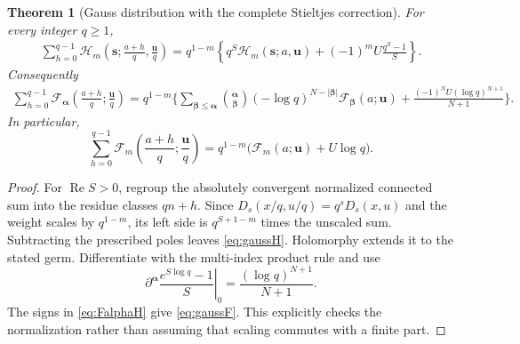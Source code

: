 \documentclass[11pt]{article}
\numberwithin{equation}{section}
\newtheorem{theorem}{Theorem}[section]
\theoremstyle{definition}\newtheorem{definition}[theorem]{Definition}
\theoremstyle{remark}\newtheorem{remark}[theorem]{Remark}
\newcommand{\Rea}{\operatorname{Re}}
\newcommand{\bs}{\boldsymbol{s}}
\newcommand{\bu}{\boldsymbol{u}}
\newcommand{\ba}{\boldsymbol{\alpha}}
\newcommand{\bb}{\boldsymbol{\beta}}
\newcommand{\cH}{\mathcal H}
\newcommand{\cF}{\mathcal F}
\begin{document}
\begin{theorem}[Gauss distribution with the complete Stieltjes correction]\label{thm:gauss}
For every integer $q\ge1$,
\begin{align}\label{eq:gaussH}
 \sum_{h=0}^{q-1}\cH_m\left(\bs;\frac{a+h}{q},\frac{\bu}{q}\right)
 =q^{1-m}\left\{q^S\cH_m(\bs;a,\bu)
       +(-1)^mU\frac{q^S-1}{S}\right\}.
\end{align}
Consequently
\begin{align}\label{eq:gaussF}
 \sum_{h=0}^{q-1}\cF_{\ba}\left(\frac{a+h}{q};\frac{\bu}{q}\right)
 =q^{1-m}\biggl\{
 \sum_{\bb\le\ba}\binom{\ba}{\bb}
 (-\log q)^{N-|\bb|}\cF_{\bb}(a;\bu)
 +\frac{(-1)^N U(\log q)^{N+1}}{N+1}\biggr\}.
\end{align}
In particular,
\begin{equation}\label{eq:gausszero}
 \sum_{h=0}^{q-1}\cF_m\left(\frac{a+h}{q};\frac{\bu}{q}\right)
 =q^{1-m}\bigl(\cF_m(a;\bu)+U\log q\bigr).
\end{equation}
\end{theorem}
\begin{proof}
For $\Rea S>0$, regroup the absolutely convergent normalized connected sum into the residue classes $qn+h$. Since
$D_s(x/q,u/q)=q^sD_s(x,u)$ and the weight scales by $q^{1-m}$, its left side is $q^{S+1-m}$ times the unscaled sum. Subtracting the prescribed poles leaves \eqref{eq:gaussH}. Holomorphy extends it to the stated germ. Differentiate with the multi-index product rule and use
\[
 \left.\partial^{\ba}\frac{e^{S\log q}-1}{S}\right|_0
 =\frac{(\log q)^{N+1}}{N+1}.
\]
The signs in \eqref{eq:FalphaH} give \eqref{eq:gaussF}. This explicitly checks the normalization rather than assuming that scaling commutes with a finite part.
\end{proof}
\end{document}
